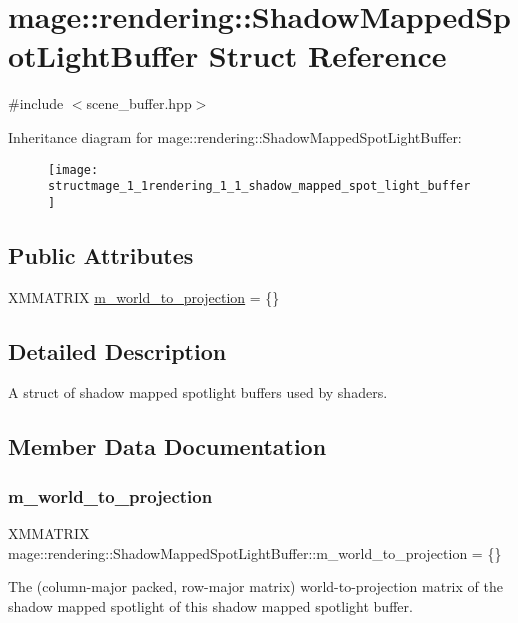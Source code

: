 \hypertarget{structmage_1_1rendering_1_1_shadow_mapped_spot_light_buffer}{}\section{mage\+:\+:rendering\+:\+:Shadow\+Mapped\+Spot\+Light\+Buffer Struct Reference}
\label{structmage_1_1rendering_1_1_shadow_mapped_spot_light_buffer}


{\ttfamily \#include $<$scene\+\_\+buffer.\+hpp$>$}

Inheritance diagram for mage\+:\+:rendering\+:\+:Shadow\+Mapped\+Spot\+Light\+Buffer\+:\begin{figure}[H]
\begin{center}
\leavevmode
\texttt{[image: structmage\_1\_1rendering\_1\_1\_shadow\_mapped\_spot\_light\_buffer]}
\end{center}
\end{figure}
\subsection*{Public Attributes}
\begin{DoxyCompactItemize}
\item 
X\+M\+M\+A\+T\+R\+IX \mbox{\hyperlink{structmage_1_1rendering_1_1_shadow_mapped_spot_light_buffer_abb736c590c4a6efff217e15ef8abec4a}{m\+\_\+world\+\_\+to\+\_\+projection}} = \{\}
\end{DoxyCompactItemize}


\subsection{Detailed Description}
A struct of shadow mapped spotlight buffers used by shaders. 

\subsection{Member Data Documentation}
\mbox{\label{structmage_1_1rendering_1_1_shadow_mapped_spot_light_buffer_abb736c590c4a6efff217e15ef8abec4a}} 
\subsubsection{\texorpdfstring{m\+\_\+world\+\_\+to\+\_\+projection}{m\_world\_to\_projection}}
{\footnotesize\ttfamily X\+M\+M\+A\+T\+R\+IX mage\+::rendering\+::\+Shadow\+Mapped\+Spot\+Light\+Buffer\+::m\+\_\+world\+\_\+to\+\_\+projection = \{\}}

The (column-\/major packed, row-\/major matrix) world-\/to-\/projection matrix of the shadow mapped spotlight of this shadow mapped spotlight buffer. 